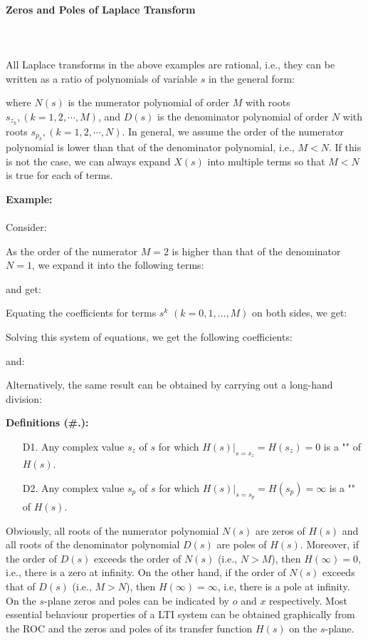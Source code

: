 	\paragraph{Zeros and Poles of Laplace Transform}\mbox{}\\\\
	All Laplace transforms in the above examples are rational, i.e., they can be written as a ratio of polynomials of variable $s$ in the general form:
	
	where $N(s)$ is the numerator polynomial of order $M$ with roots $s_{z_k}, (k=1,2, \cdots, M)$, and $D(s)$ is the denominator polynomial of order $N$ with roots $s_{p_k}, (k=1,2, \cdots, N)$. In general, we assume the order of the numerator polynomial is lower than that of the denominator polynomial, i.e.,  $M < N$. If this is not the case, we can always expand $X(s)$ into multiple terms so that $M<N$ is true for each of terms.	
	\begin{tcolorbox}[colframe=black,colback=white,sharp corners]
	\textbf{{\Large {}}Example:}\\\\
	Consider:
	
	As the order of the numerator $M=2$ is higher than that of the denominator $N=1$, we expand it into the following terms:
	
	and get:
	
	Equating the coefficients for terms $s^k$ $(k=0, 1, \ldots, M)$ on both sides, we get:
	
	Solving this system of equations, we get the following coefficients:
	
	and:
	
	Alternatively, the same result can be obtained by carrying out a long-hand division:
	
	\end{tcolorbox}
	
	\textbf{Definitions (\#\thesection.\mydef):}
	\begin{enumerate}
		\item[D1.] Any complex value $s_z$ of $s$ for which $H(s)|_{s=s_z}=H(s_z)=0$ is a "" of $H(s)$.

		\item[D2.] Any complex value $s_p$ of $s$ for which $H(s)|_{s=s_p}=H(s_p)=\infty$ is a "" of $H(s)$.
	\end{enumerate}
	Obviously, all roots of the numerator polynomial $N(s)$ are zeros of $H(s)$ and all roots of the denominator polynomial $D(s)$ are poles of $H(s)$. Moreover, if the order of $D(s)$ exceeds the order of $N(s)$ (i.e., $N>M$), then $H(\infty)=0$, i.e., there is a zero at infinity. On the other hand, if the order of $N(s)$ exceeds that of $D(s)$ (i.e., $M>N$), then $H(\infty)=\infty$, i.e, there is a pole at infinity. On the $s$-plane zeros and poles can be indicated by $o$ and $x$ respectively. Most essential behaviour properties of a LTI system can be obtained graphically from the ROC and the zeros and poles of its transfer function $H(s)$ on the $s$-plane.
	
